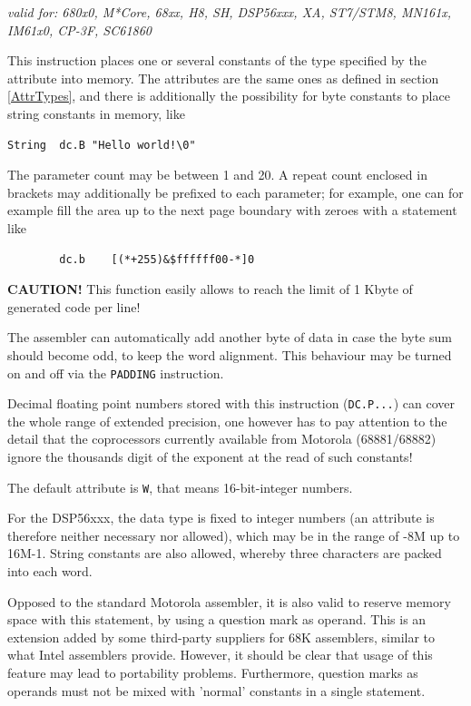 \documentclass[12pt,twoside]{report}
\newcommand{\bb}[1]{{\bf #1}}
\newcommand{\tty}[1]{{\tt #1}}
\begin{document}
{\em valid for: 680x0, M*Core, 68xx, H8, SH, DSP56xxx, XA,
  ST7/STM8, MN161x, IM61x0, CP-3F, SC61860}

This instruction places one or several constants of the type
specified by the attribute into memory.  The attributes are the same ones as
defined in section \ref{AttrTypes}, and there is additionally the
possibility for byte constants to place string constants in memory, like
\begin{verbatim}
String  dc.B "Hello world!\0"
\end{verbatim}
The parameter count may be between 1 and 20.  A repeat count enclosed
in brackets may additionally be prefixed to each parameter; for
example, one can for example fill the area up to the next page
boundary with zeroes with a statement like
\begin{verbatim}
        dc.b    [(*+255)&$ffffff00-*]0
\end{verbatim}
\bb{CAUTION!}  This function easily allows to reach the limit of 1 Kbyte
of generated code per line!

The assembler can automatically add another byte of data in case the byte sum
should become odd, to keep the word alignment.  This behaviour may be
turned on and off via the \tty{PADDING} instruction.

Decimal floating point numbers stored with this instruction (\tty{DC.P...})
can cover the whole range of extended precision, one however has to
pay attention to the detail that the coprocessors currently available
from Motorola (68881/68882) ignore the thousands digit of the
exponent at the read of such constants!

The default attribute is \tty{W}, that means 16-bit-integer numbers.

For the DSP56xxx, the data type is fixed to integer numbers (an attribute is
therefore neither necessary nor allowed), which may be in the range
of -8M up to 16M-1.  String constants are also allowed, whereby three characters
are packed into each word.

Opposed to the standard Motorola assembler, it is also valid to reserve
memory space with this statement, by using a question mark as operand.
This is an extension added by some third-party suppliers for 68K
assemblers, similar to what Intel assemblers provide.  However, it should
be clear that usage of this feature may lead to portability problems.
Furthermore, question marks as operands must not be mixed with 'normal'
constants in a single statement.

\end{document}

